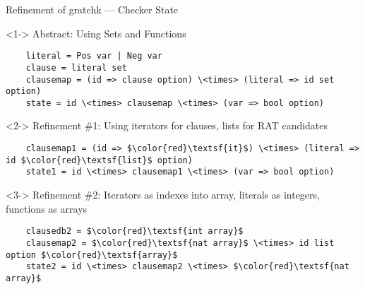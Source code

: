 \documentclass[fleqn]{beamer}
\begin{document}
\begin{frame}[fragile]{Refinement of gratchk --- Checker State}
  \begin{uncoverenv}<1->
  Abstract: Using Sets and Functions
  \begin{lstlisting}
    literal = Pos var | Neg var
    clause = literal set  
    clausemap = (id => clause option) \<times> (literal => id set option)
    state = id \<times> clausemap \<times> (var => bool option)
  \end{lstlisting}
  \end{uncoverenv}
    
  \begin{uncoverenv}<2->
  Refinement \#1: Using iterators for clauses, lists for RAT candidates  
  \begin{lstlisting}
    clausemap1 = (id => $\color{red}\textsf{it}$) \<times> (literal => id $\color{red}\textsf{list}$ option)
    state1 = id \<times> clausemap1 \<times> (var => bool option)
  \end{lstlisting}
  \end{uncoverenv}
    
  \begin{uncoverenv}<3->
  Refinement \#2: Iterators as indexes into array, literals as integers, functions as arrays
  \begin{lstlisting}
    clausedb2 = $\color{red}\textsf{int array}$
    clausemap2 = $\color{red}\textsf{nat array}$ \<times> id list option $\color{red}\textsf{array}$
    state2 = id \<times> clausemap2 \<times> $\color{red}\textsf{nat array}$
  \end{lstlisting}
  \end{uncoverenv}
    
\end{frame}
\end{document}
